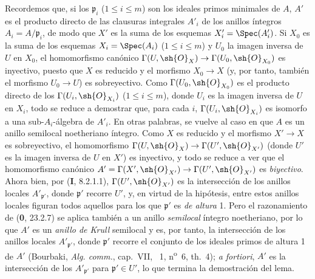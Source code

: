 Recordemos que, si los $\mathfrak p_i$ ($1\leq i\leq m$) son los ideales primos minimales de $A$, $A'$ es el producto directo de las clausuras integrales $A'_i$ de los anillos íntegros $A_i=A/\mathfrak p_i$, de modo que $X'$ es la suma de los esquemas $X'_i=\Spec(A'_i)$. Si $X_0$ es la suma de los esquemas $X_i=\Spec(A_i)$ ($1\leq i\leq m$) y $U_0$ la imagen inversa de $U$ en $X_0$, el homomorfismo canónico $\Gamma(U,\sh{O}_X)\to\Gamma(U_0,\sh{O}_{X_0})$ es inyectivo, puesto que $X$ es reducido y el morfismo $X_0\to X$ (y, por tanto, también el morfismo $U_0\to U$) es sobreyectivo. Como $\Gamma(U_0,\sh{O}_{X_0})$ es el producto directo de los $\Gamma(U_i,\sh{O}_{X_i})$ ($1\leq i\leq m$), donde $U_i$ es la imagen inversa de $U$ en $X_i$, todo se reduce a demostrar que, para cada $i$, $\Gamma(U_i,\sh{O}_{X_i})$ es isomorfo a una sub-$A_i$-álgebra de $A'_i$. En otras palabras, se vuelve al caso en que $A$ es un anillo semilocal noetheriano íntegro. Como $X$ es reducido y el morfismo $X'\to X$ es sobreyectivo, el homomorfismo $\Gamma(U,\sh{O}_X)\to\Gamma(U',\sh{O}_{X'})$ (donde $U'$ es la imagen inversa de $U$ en $X'$) es inyectivo, y todo se reduce a ver que el homomorfismo canónico $A'=\Gamma(X',\sh{O}_{X'})\to\Gamma(U',\sh{O}_{X'})$ es \emph{biyectivo}. Ahora bien, por (\textbf I, 8.2.1.1), $\Gamma(U',\sh{O}_{X'})$ es la intersección de los anillos locales $A'_{\mathfrak p'}$, donde $\mathfrak p'$ recorre $U'$, y, en virtud de la hipótesis, entre estos anillos locales figuran todos aquellos para los que $\mathfrak p'$ es \emph{de altura} 1. Pero el razonamiento de (\textbf 0, 23.2.7) se aplica también a un anillo \emph{semilocal} íntegro noetheriano, por lo que $A'$ es un \emph{anillo de Krull} semilocal y es, por tanto, la intersección de los anillos locales $A'_{\mathfrak p'}$, donde $\mathfrak p'$ recorre el conjunto de los ideales primos de altura 1 de $A'$ (Bourbaki, \emph{Alg. comm.}, cap.~VII, \textsection~1, n\textsuperscript{o}~6, th.~4); \emph{a fortiori}, $A'$ es la intersección de los $A'_{\mathfrak p'}$ para $\mathfrak p'\in U'$, lo que termina la demostración del lema.

